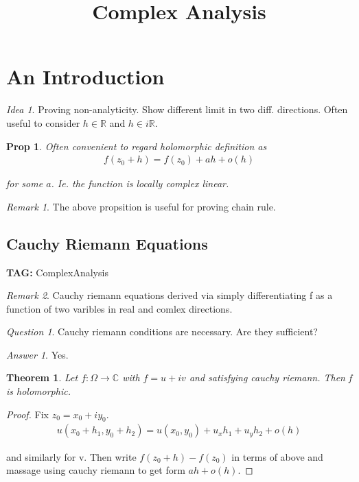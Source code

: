 \documentclass[11pt]{article}
\title{Complex Analysis}
\newcommand{\R}{\mathbb{R}}
\newcommand{\C}{\mathbb{C}}
\newtheorem{theorem}{Theorem}
\newtheorem{prop}{Prop}
\theoremstyle{remark}
\newtheorem{remark}{Remark}
\newtheorem{quest}{Question}
\newtheorem{ans}{Answer}
\newtheorem{idea}{Idea}
\begin{document}
\maketitle

\section{An Introduction}

\begin{idea}
	Proving non-analyticity. Show different limit in two diff. directions. Often useful to consider $h \in \R$ and $h \in i \R$. 
\end{idea}

\begin{prop}
	Often convenient to regard holomorphic definition as
	\begin{align*}
		f(z_0 + h) = f(z_0) + ah + o(h)
	\end{align*}

	for some $a$. Ie. the function is locally complex linear.
\end{prop}

\begin{remark}
	The above propsition is useful for proving chain rule.
\end{remark}

\subsection{Cauchy Riemann Equations}

\textbf{TAG:} ComplexAnalysis

\begin{remark}
	Cauchy riemann equations derived via simply differentiating f as a function of two varibles in real and comlex directions.
\end{remark}

\begin{quest}
	Cauchy riemann conditions are necessary. Are they sufficient?
\end{quest}

\begin{ans}
	Yes. 
	\begin{theorem}
		Let $f : \Omega \to \C$ with $f = u + iv$ and satisfying cauchy riemann. Then f is holomorphic.
	\end{theorem}
	\begin{proof}
		Fix $z_0 = x_0 + i y_0$.
		\begin{align*}
			u(x_0+h_1,y_0+h_2) = u(x_0,y_0) + u_xh_1 + u_y h_2 + o(h)
		\end{align*}

		and similarly for v. Then write $f(z_0 + h) - f(z_0)$ in terms of above and massage using cauchy riemann to get form $ah + o(h)$. 
	\end{proof}
\end{ans}
\end{document}
